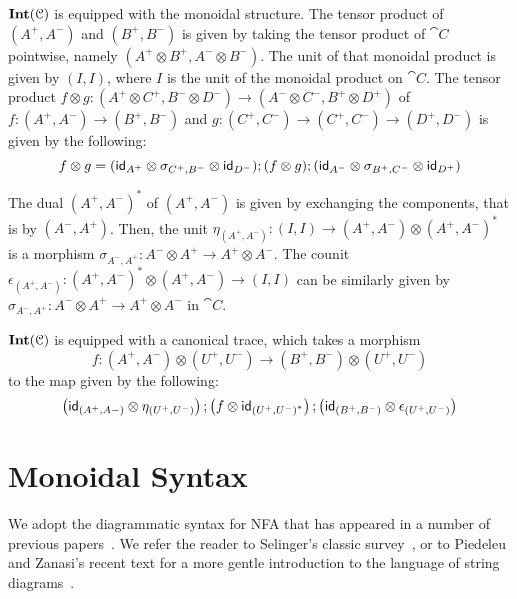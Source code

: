 	$\mathbf{Int}(\mathcal{C})$ is equipped with the monoidal structure. The tensor product of $(A^+, A^-)$ and $(B^+, B^-)$ is given by taking the tensor product of $\cat{C}$ pointwise, namely $(A^+ \otimes B^+, A^- \otimes B^-)$. The unit of that monoidal product is given by $(I, I)$, where $I$ is the unit of the monoidal product on $\cat{C}$. The tensor product $f \otimes g \colon (A^+ \otimes C^+, B^- \otimes D^-) \to (A^- \otimes C^-, B^+ \otimes D^+)$ of $f \colon (A^+, A^-) \to (B^+, B^-)$ and $g \colon (C^+, C^-) \to (C^+, C^-) \to (D^+, D^-)$ is given by the following:
	$$
	f \otimes g = (\mathsf{id}_{A^+} \otimes \sigma_{C^+, B^-} \otimes \mathsf{id}_{D^-});(f \otimes g);(\mathsf{id}_{A^-} \otimes \sigma_{B^+, C^-} \otimes \mathsf{id}_{D^+})
	$$
	
	The dual $(A^+, A^-)^{\ast}$ of $(A^+, A^-)$ is given by exchanging the components, that is by $(A^-, A^+)$. Then, the unit $\eta_{(A^+, A^-)} \colon (I,I) \to (A^+, A^-) \otimes (A^+, A^-)^{\ast}$ is a morphism $\sigma_{A^-, A^+} \colon A^- \otimes A^+ \to A^+ \otimes A^-$. The counit $\epsilon_{(A^+, A^-)} \colon (A^+, A^-)^\ast \otimes (A^+, A^-) \to (I,I)$ can be similarly given by $\sigma_{A^-, A^+} \colon A^- \otimes A^+ \to A^+ \otimes A^-$ in $\cat{C}$.
	
	$\mathbf{Int}(\mathcal{C})$ is equipped with a canonical trace, which takes a morphism $$f \colon (A^+, A^-) \otimes (U^+, U^-) \to (B^+, B^-) \otimes (U^+, U^-)$$ to the map given by the following:
	\[
	\left(\mathsf{id}_{(A^+, A-)} \otimes \eta_{(U^+, U^-)}\right) ;\left(f \otimes \mathsf{id}_{{(U^+, U^-)}^\ast}\right); \left(\mathsf{id}_{(B^+, B^-)} \otimes \epsilon_{(U^+, U^-)}  \right)
	\]
	
	\section{Monoidal Syntax}\label{c3:sec:monoidal}
We adopt the diagrammatic syntax for NFA that has appeared in a number of previous papers~\cite{piedeleu2023finite,antoinecsl2025}. 
We refer the reader to Selinger's classic survey~\cite{Selinger_2010}, or to Piedeleu and Zanasi's recent text for a more gentle introduction to the language of string diagrams~\cite{piedeleu2023introduction}.

